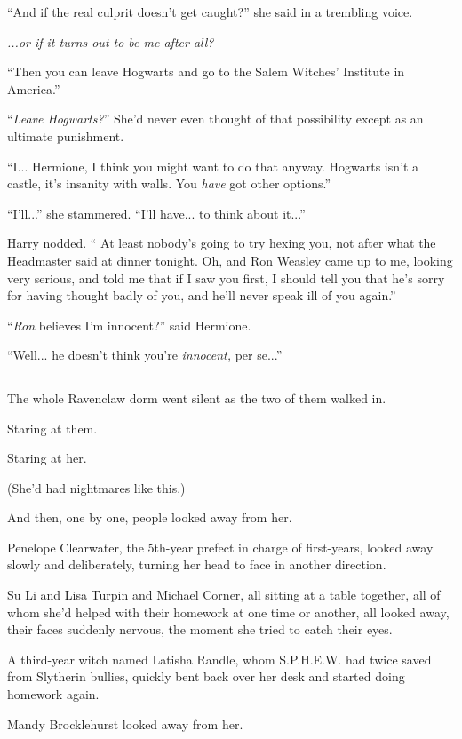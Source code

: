 ``And if the real culprit doesn't get caught?'' she said in a trembling voice.

\emph{...or if it turns out to be me after all?}

``Then you can leave Hogwarts and go to the Salem Witches' Institute in America.''

``\emph{Leave Hogwarts?}'' She'd never even thought of that possibility except as an ultimate punishment.

``I... Hermione, I think you might want to do that anyway. Hogwarts isn't a castle, it's insanity with walls. You \emph{have} got other options.''

``I'll...'' she stammered. ``I'll have... to think about it...''

Harry nodded. `` At least nobody's going to try hexing you, not after what the Headmaster said at dinner tonight. Oh, and Ron Weasley came up to me, looking very serious, and told me that if I saw you first, I should tell you that he's sorry for having thought badly of you, and he'll never speak ill of you again.''

``\emph{Ron} believes I'm innocent?'' said Hermione.

``Well... he doesn't think you're \emph{innocent,} per se...''

\begin{center}\rule{3in}{0.4pt}\end{center}

The whole Ravenclaw dorm went silent as the two of them walked in.

Staring at them.

Staring at her.

(She'd had nightmares like this.)

And then, one by one, people looked away from her.

Penelope Clearwater, the 5th-year prefect in charge of first-years, looked away slowly and deliberately, turning her head to face in another direction.

Su Li and Lisa Turpin and Michael Corner, all sitting at a table together, all of whom she'd helped with their homework at one time or another, all looked away, their faces suddenly nervous, the moment she tried to catch their eyes.

A third-year witch named Latisha Randle, whom S.P.H.E.W. had twice saved from Slytherin bullies, quickly bent back over her desk and started doing homework again.

Mandy Brocklehurst looked away from her.

